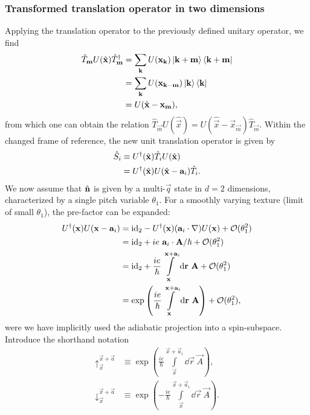 \documentclass[
    aps,
    prb,
    twocolumn,
    floatfix,
    superscriptaddress,
	10pt
]{revtex4-2}
\begin{document}
\subsubsection{Transformed translation operator in two dimensions}

Applying the translation operator to the previously defined unitary operator, we find
\begin{align}
	\hat{T}_\vec{m} U( \hat{\vec{x}}) \hat{T}_\vec{m}^\dagger
	& = \sum_{\vec{k}} U(\vec{x}_\vec{k}) \ket{\vec{k}+\vec{m}} \bra{\vec{k}+\vec{m}}
	\notag \\
	& = \sum_{\vec{k}} U( \vec{x}_{\vec{k}- \vec{m}} ) \ket{\vec{k}} \bra{\vec{k}}
	\notag \\
	& = U( \hat{\vec{x}} - \vec{x}_\vec{m}),
\end{align}
from which one can obtain the relation
$\hat{T}_\vec{m} U( \hat{\vec{x}}) = U( \hat{\vec{x}} - \vec{x}_\vec{m}) \hat{T}_\vec{m}$.
Within the changed frame of reference, the new unit translation operator is given by
\begin{align}
	\hat{S}_i &\equiv U^\dagger ( \hat{\vec{x}}) \hat{T}_i U ( \hat{\vec{x}})
	\notag \\ &=
	U^\dagger ( \hat{\vec{x}}) U( \hat{\vec{x}} - \vec{a}_i) \hat{T}_i  .
\end{align}
We now assume that $\hatn$ is given by a multi-$\vec{q}$ state in $d=2$ dimensions, characterized by a single pitch variable $\theta_1$.
For a smoothly varying texture (limit of small $\theta_1$), the pre-factor can be expanded:
\begin{align}
	U^\dagger ( \vec{x}) U( \vec{x} - \vec{a}_i) 
	& = \id_2
	- U^\dagger ( \vec{x})( \vec{a}_i \cdot \nabla) U( \vec{x} ) + \mathcal{O}(\theta_1^2)
	\notag \\
	& = \id_2
	+ i  e~\vec{a}_i  \cdot \vec{A} / \hbar + \mathcal{O}(\theta_1^2)
	\notag \\
	& = \id_2
	+ \frac{i e}{\hbar} \int\limits_{\vec{x}}^{\vec{x}+\vec{a}_i} \dd\vec{r}~\vec{A}  + \mathcal{O}(\theta_1^2) 
	\notag \\
	& = \exp\left( \frac{i e}{\hbar} \int\limits_{\vec{x}}^{\vec{x}+\vec{a}_i} \dd\vec{r}~\vec{A} \right) + \mathcal{O}(\theta_1^2) ,
\end{align}
were we have implicitly used the adiabatic projection into a spin-subspace.
Introduce the shorthand notation
\begin{align}
	\uparrow_{\vec{x}}^{\vec{x}+\vec{a} } &\equiv \exp\left( \frac{i e}{\hbar} \int\limits_{\vec{x}}^{\vec{x}+\vec{a}_i} \dd\vec{r}~\vec{A} \right) ,
	\\
	\downarrow_{\vec{x}}^{\vec{x}+\vec{a} } &\equiv \exp\left( -\frac{i e}{\hbar} \int\limits_{\vec{x}}^{\vec{x}+\vec{a}_i} \dd\vec{r}~\vec{A} \right) .
\end{align}
\end{document}
